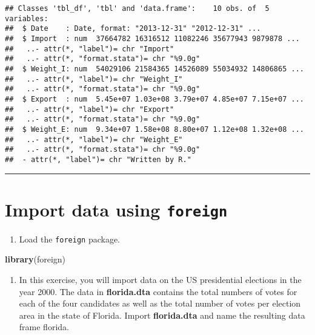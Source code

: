 \documentclass[]{article}
\newenvironment{Shaded}{\begin{snugshade}}{\end{snugshade}}
\newcommand{\KeywordTok}[1]{\textcolor[rgb]{0.13,0.29,0.53}{\textbf{#1}}}
\newcommand{\StringTok}[1]{\textcolor[rgb]{0.31,0.60,0.02}{#1}}
\newcommand{\OperatorTok}[1]{\textcolor[rgb]{0.81,0.36,0.00}{\textbf{#1}}}
\newcommand{\NormalTok}[1]{#1}
\providecommand{\tightlist}{%
  \setlength{\itemsep}{0pt}\setlength{\parskip}{0pt}}
\begin{document}
\begin{Shaded}
\end{Shaded}

\begin{verbatim}
## Classes 'tbl_df', 'tbl' and 'data.frame':    10 obs. of  5 variables:
##  $ Date    : Date, format: "2013-12-31" "2012-12-31" ...
##  $ Import  : num  37664782 16316512 11082246 35677943 9879878 ...
##   ..- attr(*, "label")= chr "Import"
##   ..- attr(*, "format.stata")= chr "%9.0g"
##  $ Weight_I: num  54029106 21584365 14526089 55034932 14806865 ...
##   ..- attr(*, "label")= chr "Weight_I"
##   ..- attr(*, "format.stata")= chr "%9.0g"
##  $ Export  : num  5.45e+07 1.03e+08 3.79e+07 4.85e+07 7.15e+07 ...
##   ..- attr(*, "label")= chr "Export"
##   ..- attr(*, "format.stata")= chr "%9.0g"
##  $ Weight_E: num  9.34e+07 1.58e+08 8.80e+07 1.12e+08 1.32e+08 ...
##   ..- attr(*, "label")= chr "Weight_E"
##   ..- attr(*, "format.stata")= chr "%9.0g"
##  - attr(*, "label")= chr "Written by R."
\end{verbatim}

\begin{center}\rule{0.5\linewidth}{\linethickness}\end{center}

\section{\texorpdfstring{Import data using
\texttt{foreign}}{Import data using foreign}}\label{import-data-using-foreign}

\begin{enumerate}
\def\labelenumi{\arabic{enumi}.}
\tightlist
\item
  Load the \texttt{foreign} package.
\end{enumerate}

\begin{Shaded}
\begin{Highlighting}[]
\KeywordTok{library}\NormalTok{(foreign)}
\end{Highlighting}
\end{Shaded}

\begin{enumerate}
\def\labelenumi{\arabic{enumi}.}
\tightlist
\item
  In this exercise, you will import data on the US presidential
  elections in the year 2000. The data in \textbf{florida.dta} contains
  the total numbers of votes for each of the four candidates as well as
  the total number of votes per election area in the state of Florida.
  Import \textbf{florida.dta} and name the resulting data frame florida.
\end{enumerate}
\end{document}
